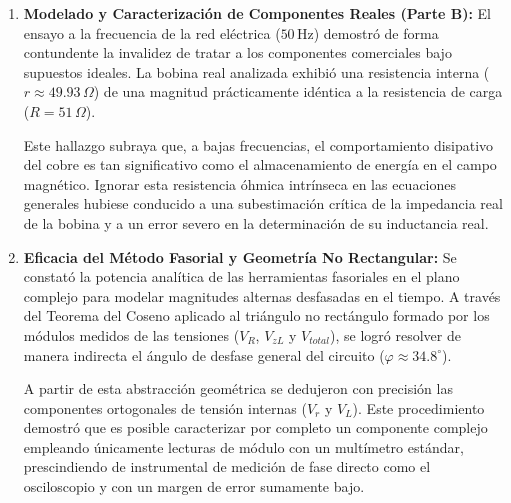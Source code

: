 \begin{enumerate}
    \item \textbf{Modelado y Caracterización de Componentes Reales (Parte B):} El ensayo a la frecuencia de la red eléctrica ($50\,\text{Hz}$) demostró de forma contundente la invalidez de tratar a los componentes comerciales bajo supuestos ideales. La bobina real analizada exhibió una resistencia interna ($r \approx 49.93\,\Omega$) de una magnitud prácticamente idéntica a la resistencia de carga ($R = 51\,\Omega$). 
    
    Este hallazgo subraya que, a bajas frecuencias, el comportamiento disipativo del cobre es tan significativo como el almacenamiento de energía en el campo magnético. Ignorar esta resistencia óhmica intrínseca en las ecuaciones generales hubiese conducido a una subestimación crítica de la impedancia real de la bobina y a un error severo en la determinación de su inductancia real.

    \item \textbf{Eficacia del Método Fasorial y Geometría No Rectangular:} Se constató la potencia analítica de las herramientas fasoriales en el plano complejo para modelar magnitudes alternas desfasadas en el tiempo. A través del Teorema del Coseno aplicado al triángulo no rectángulo formado por los módulos medidos de las tensiones ($V_R$, $V_{zL}$ y $V_{total}$), se logró resolver de manera indirecta el ángulo de desfase general del circuito ($\varphi \approx 34.8^\circ$). 
    
    A partir de esta abstracción geométrica se dedujeron con precisión las componentes ortogonales de tensión internas ($V_r$ y $V_L$). Este procedimiento demostró que es posible caracterizar por completo un componente complejo empleando únicamente lecturas de módulo con un multímetro estándar, prescindiendo de instrumental de medición de fase directo como el osciloscopio y con un margen de error sumamente bajo.
\end{enumerate}

